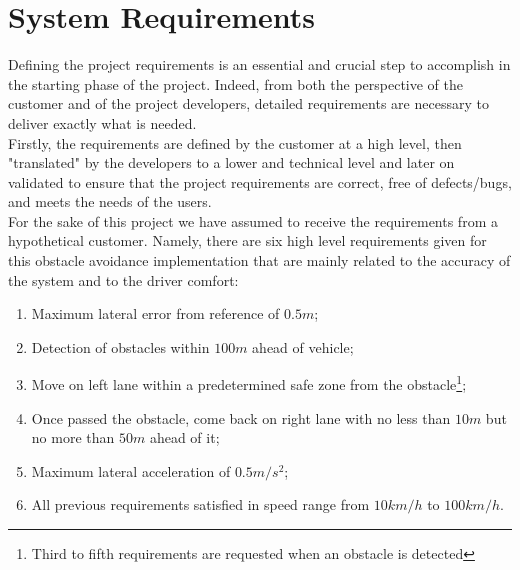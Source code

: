 \section{System Requirements} \label{System_Requirements}


Defining the project requirements is an essential and crucial step to accomplish in the starting phase of the project. Indeed, from both the perspective of the customer and of the project developers, detailed requirements are necessary to deliver exactly what is needed.\\
Firstly, the requirements are defined by the customer at a high level, then "translated" by the developers to a lower and technical level and later on validated to ensure that the project requirements are correct, free of defects/bugs, and meets the needs of the users.\\
For the sake of this project we have assumed to receive the requirements from a hypothetical customer.
Namely, there are six high level requirements given for this obstacle avoidance implementation that are mainly related to the accuracy of the system and to the driver comfort:
\begin{enumerate}
    \item Maximum lateral error from reference of $0.5 m$;
    \item Detection of obstacles within $100 m$ ahead of vehicle;
    \item Move on left lane within a predetermined safe zone from the obstacle\footnote{Third to fifth requirements are requested when an obstacle is detected};
    \item Once passed the obstacle, come back on right lane with no less than $10 m$ but no more than $50 m$ ahead of it;
    \item Maximum lateral acceleration of $0.5 m/s^2$;
    \item All previous requirements satisfied in speed range from $10 km/h$ to $100 km/h$.
\end{enumerate}
